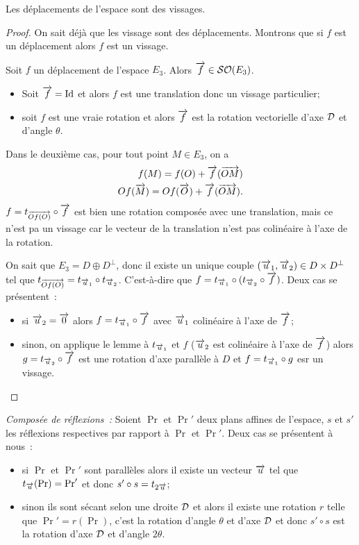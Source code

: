 \begin{theo}
  Les déplacements de l'espace sont des vissages.
\end{theo}
\begin{proof}
  On sait déjà que les vissage sont des déplacements. Montrons que si $f$ est un déplacement alors $f$ est un vissage. 

  Soit $f$ un déplacement de l'espace $E_3$. Alors $\overrightarrow{f} \in \mathcal{SO}\!\left(E_3\right)$.
  \begin{itemize}
  \item Soit $\overrightarrow{f}=\operatorname{Id}$ et alors $f$ est une translation donc un vissage particulier;
  \item soit $f$ est une vraie rotation et alors $\overrightarrow{f}$ est la rotation vectorielle d'axe $\mathcal{D}$ et d'angle $\theta$.
  \end{itemize}
  Dans le deuxième cas, pour tout point $M \in E_3$, on a
  \begin{align}
    f(M) = f(O) +\overrightarrow{f}(\overrightarrow{OM}) \\
    Of(\overrightarrow{M}) = Of(\overrightarrow{O}) +\overrightarrow{f}(\overrightarrow{OM}).
  \end{align}
  $f=t_{\overrightarrow{Of(O)}} \circ \overrightarrow{f}$ est bien une rotation composée avec une translation, mais ce n'est pa un vissage car le vecteur de la translation n'est pas colinéaire à l'axe de la rotation.

  On sait que $E_3 = D \oplus D^\perp$, donc il existe un unique couple $(\overrightarrow{u}_1, \overrightarrow{u}_2) \in D \times D^\perp$ tel que $t_{\overrightarrow{Of(O)}} = t_{\overrightarrow{u}_1} \circ t_{\overrightarrow{u}_2}$. C'est-à-dire que $f= t_{\overrightarrow{u}_1} \circ (t_{\overrightarrow{u}_2} \circ \overrightarrow{f})$. Deux cas se présentent~:
  \begin{itemize}
  \item si $\overrightarrow{u}_2=\overrightarrow{0}$ alors $f= t_{\overrightarrow{u}_1} \circ \overrightarrow{f}$ avec $\overrightarrow{u}_1$ colinéaire à l'axe de $\overrightarrow{f}$;
  \item sinon, on applique le lemme à $t_{\overrightarrow{u}_1}$ et $f$ ($\overrightarrow{u}_2$ est colinéaire à l'axe de $\overrightarrow{f}$) alors $g=t_{\overrightarrow{u}_2} \circ \overrightarrow{f}$ est une rotation d'axe parallèle à $D$ et $f=t_{\overrightarrow{u}_1} \circ g$ esr un vissage.
  \end{itemize}
\end{proof}

\emph{Composée de réflexions~:} Soient $\Pr$ et $\Pr'$ deux plans affines de l'espace, $s$ et $s'$ les réflexions respectives par rapport à $\Pr$ et $\Pr'$. Deux cas se présentent à nous~:
\begin{itemize}
\item si $\Pr$ et $\Pr'$ sont parallèles alors il existe un vecteur $\overrightarrow{u}$ tel que $t_{\overrightarrow{u}}(\Pr)=\Pr'$ et donc $s'\circ s=t_{2\overrightarrow{u}}$;
\item sinon ils sont sécant selon une droite $\mathcal{D}$ et alors il existe une rotation $r$ telle que $\Pr'=r(\Pr)$, c'est la rotation d'angle $\theta$ et d'axe $\mathcal{D}$ et donc $s' \circ s$ est la rotation d'axe $\mathcal{D}$ et d'angle $2\theta$.
\end{itemize}

